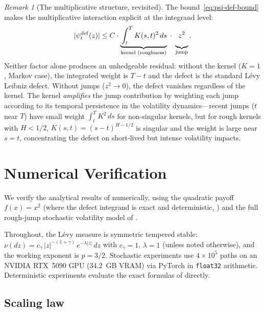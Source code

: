 \documentclass[11pt,a4paper]{article}
\theoremstyle{plain}
\theoremstyle{definition}
\theoremstyle{remark}
\newtheorem{remark}[theorem]{Remark}
\begin{document}
\begin{remark}[The multiplicative structure, revisited]
\label{rem:multiplicative}
The bound~\eqref{eq:psi-def-bound} makes the multiplicative
interaction explicit at the integrand level:
\[
  |\psi_t^{\mathrm{def}}(z)| \leq
  C \cdot \underbrace{\vphantom{\bigg|}
  \int_t^T K(s,t)^2\,ds}_{\text{kernel (roughness)}}
  \;\cdot\; \underbrace{z^2\vphantom{\bigg|}}_{\text{jump}}.
\]
Neither factor alone produces an unhedgeable residual:
without the kernel ($K = 1$, Markov case), the integrated weight
is $T - t$ and the defect is the standard L\'evy Leibniz defect.
Without jumps ($z^2 \to 0$), the defect vanishes regardless of
the kernel.  The kernel \emph{amplifies} the jump contribution
by weighting each jump according to its temporal persistence in
the volatility dynamics---recent jumps ($t$ near $T$) have small
weight $\int_t^T K^2\,ds$ for non-singular kernels, but for
rough kernels with $H < 1/2$, $K(s,t) = (s-t)^{H-1/2}$ is
singular and the weight is large near $s = t$, concentrating
the defect on short-lived but intense volatility impacts.
\end{remark}


\section{Numerical Verification}\label{sec:numerics}

We verify the analytical results of
 numerically,
using the quadratic payoff $f(x) = x^2$ (where the defect
integrand is exact and deterministic,
) and the full rough-jump stochastic
volatility model of .

Throughout, the L\'evy measure is symmetric tempered stable:
$\nu(dz) = c_\gamma\,|z|^{-(1+\gamma)}\,e^{-\lambda|z|}\,dz$
with $c_\gamma = 1$, $\lambda = 1$ (unless noted otherwise),
and the working exponent is $p = 3/2$.
Stochastic experiments use $4 \times 10^5$ paths on an
NVIDIA RTX~5090 GPU (34.2~GB VRAM) via PyTorch in
\texttt{float32} arithmetic.
Deterministic experiments evaluate the exact formulas of
 directly.


\subsection{Scaling law}
\end{document}
